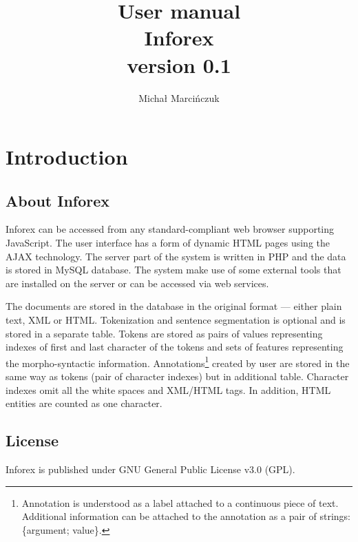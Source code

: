 \documentclass[a4paper,10pt,oneside]{scrbook}
\title{User manual \\ Inforex \\ {\large version 0.1}}
\author{Michał Marcińczuk}
\begin{document}
\maketitle

\chapter{Introduction}
\section{About Inforex}


Inforex can be accessed from any standard-compliant web browser supporting JavaScript. The user interface has a form of dynamic HTML pages using the AJAX technology. The server part of the system is written in PHP and the data is stored in MySQL database. The system make use of some external tools that are installed on the server or can be accessed via web services.

The documents are stored in the database in the original format --- either plain text, XML or HTML. Tokenization and sentence segmentation is optional and is stored in a separate table. Tokens are stored as pairs of values representing indexes of first and last character of the tokens and sets of features representing the morpho-syntactic information. Annotations\footnote{Annotation is understood as a label attached to a continuous piece of text. Additional information can be attached to the annotation as a pair of strings: \{argument; value\}.} created by user are stored in the same way as tokens (pair of character indexes) but in additional table. Character indexes omit all the white spaces and XML/HTML tags. In addition, HTML entities are counted as one character. 

\section{License}

Inforex is published under GNU General Public License v3.0 (GPL).


\end{document}
